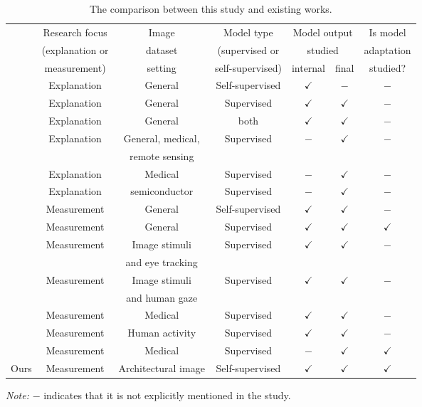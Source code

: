 \documentclass[lineno,pdflatex,sn-mathphys-num]{sn-jnl}%
\theoremstyle{thmstyleone}%
\theoremstyle{thmstyletwo}%
\theoremstyle{thmstylethree}%
\begin{document}
\begin{table}[!h]
\caption{The comparison between this study and existing works.\label{table review}}
\begin{tabular}{ccccccc}
\hline
 & Research focus  & Image & Model type & \multicolumn{2}{c}{Model output}  & Is model \\
 & (explanation or & dataset & (supervised or & \multicolumn{2}{c}{ studied}  & adaptation \\
 &  measurement) & setting & self-supervised) & internal & final &  studied? \\ \hline\hline
\cite{Kang20259339} & Explanation & General & Self-supervised & $\checkmark$ & $-$ & $-$ \\
\cite{Jo2025582} & Explanation & General & Supervised & $\checkmark$ & $\checkmark$ & $-$ \\
\cite{Liao2025PR} & Explanation & General & both & $\checkmark$ & $\checkmark$ & $-$ \\
\cite{Hanna25ICCV} & Explanation & General, medical, & Supervised & $-$ & $\checkmark$ & $-$ \\
 &  & remote sensing &   &  &  & \\
\cite{Cascone25ICCV} & Explanation & Medical & Supervised & $-$ & $\checkmark$ & $-$ \\
\cite{Feng2025AI} & Explanation & semiconductor & Supervised & $-$ & $\checkmark$ & $-$ \\
\hline
\cite{park2023what} & Measurement & General & Self-supervised & $\checkmark$ & $\checkmark$ & $-$ \\
\cite{Walmer23CVPR} & Measurement & General & Supervised & $\checkmark$ & $\checkmark$ & $\checkmark$ \\
\cite{Carrasco2026} & Measurement & Image stimuli & Supervised & $\checkmark$ & $\checkmark$ & $-$ \\
 &  & and eye tracking &   &  &  & \\
\cite{Yamamoto2025} & Measurement & Image stimuli & Supervised & $\checkmark$ & $\checkmark$ & $-$ \\
 &  & and human gaze &   &  &  & \\
\cite{Cascone2026947} & Measurement & Medical & Supervised & $\checkmark$ & $\checkmark$ & $-$ \\
\cite{Tempel2025} & Measurement & Human activity & Supervised & $\checkmark$ & $\checkmark$ & $-$ \\
\cite{Chung2025110} & Measurement & Medical & Supervised & $-$ & $\checkmark$ & $\checkmark$ \\ \hline
Ours & Measurement & Architectural image & Self-supervised & $\checkmark$ & $\checkmark$ & $\checkmark$ \\ \hline
\end{tabular}
\begin{tablenotes}
\footnotesize
\item[] \textit{Note:} $-$ indicates that it is not explicitly mentioned in the study.
\end{tablenotes}
\end{table}
\end{document}
